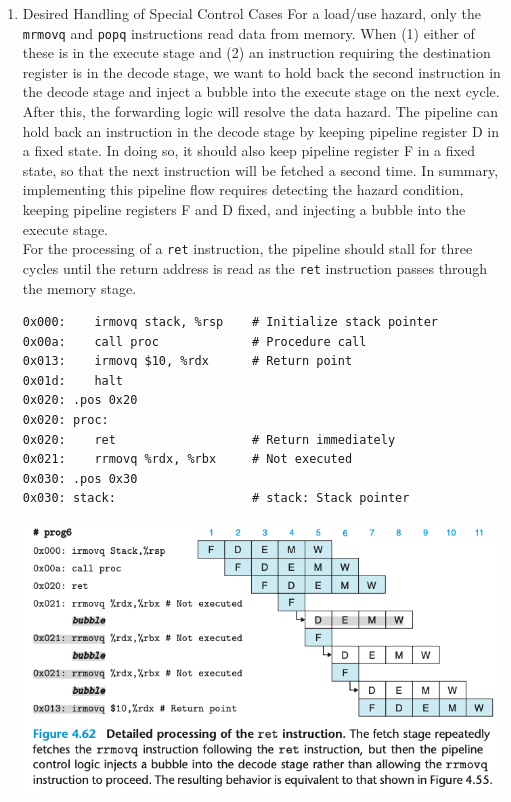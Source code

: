 \documentclass[11pt]{article}
\begin{document}
\begin{enumerate}
\item Desired Handling of Special Control Cases
\label{sec:org97544c4}
For a load/use hazard, only the \texttt{mrmovq} and \texttt{popq} instructions read data from memory. When (1) either of these is in the execute stage and (2) an instruction requiring the destination register is in the decode stage, we want to hold back the second instruction in the decode stage and inject a bubble into the execute stage on the next cycle. After this, the forwarding logic will resolve the data hazard. The pipeline can hold back an instruction in the decode stage by keeping pipeline register D in a fixed state. In doing so, it should also keep pipeline register F in a fixed state, so that the next instruction will be fetched a second time. In summary, implementing this pipeline flow requires detecting the hazard condition, keeping pipeline registers F and D fixed, and injecting a bubble into the execute stage.\\

For the processing of a \texttt{ret} instruction, the pipeline should stall for three cycles until the return address is read as the \texttt{ret} instruction passes through the memory stage.\\

\begin{verbatim}
0x000:    irmovq stack, %rsp    # Initialize stack pointer
0x00a:    call proc             # Procedure call
0x013:    irmovq $10, %rdx      # Return point
0x01d:    halt
0x020: .pos 0x20
0x020: proc:
0x020:    ret                   # Return immediately
0x021:    rrmovq %rdx, %rbx     # Not executed
0x030: .pos 0x30
0x030: stack:                   # stack: Stack pointer
\end{verbatim}

\begin{center}
\includegraphics[width=.9\linewidth]{pics/figure4.62-detailed-processing-of-the-ret-instruction.png}
\end{center}


\end{enumerate}
\end{document}

